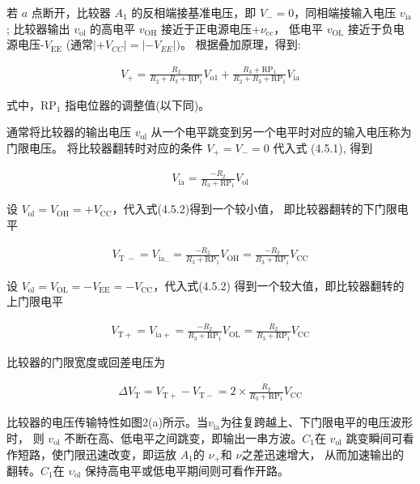\documentclass[a4paper,11pt,UTF8]{article}
\begin{document}
若 $a$ 点断开，比较器 $A_1$ 的反相端接基准电压，即 $V_-=0$，同相端接输入电压 $v_\mathrm{ia}$; 
比较器输出 $v_\mathrm{ol}$ 的高电平 $v_\mathrm{OH}$ 接近于正电源电压+$\nu_\mathrm{cc}$，
低电平 $v_\mathrm{OL}$ 接近于负电源电压-$V_\mathrm{EE}$ (通常$|+V_{CC}|=|-V_{EE}|)$。
根据叠加原理，得到:

\begin{align}
	V_{+}=\frac{R_{2}}{R_{2}+R_{3}+\mathrm{RP}_{1}}V_{\mathrm{o1}}+
    \frac{R_{3}+\mathrm{RP}_{1}}{R_{2}+R_{3}+\mathrm{RP}_{1}}V_{\mathrm{ia}}
\end{align}

式中，RP$_1$ 指电位器的调整值(以下同)。

通常将比较器的输出电压 $v_\mathrm{ol}$ 从一个电平跳变到另一个电平时对应的输入电压称为门限电压。
将比较器翻转时对应的条件 $V_+=V_-=0$ 代入式 (4.5.1), 得到

\begin{align}
	V_{\mathrm{ia}}=\frac{-R_{2}}{R_{3}+\mathrm{RP}_{1}}V_{\mathrm{ol}}
\end{align}

设 $V_{\mathrm{ol}}=V_{\mathrm{OH}}=+V_{\mathrm{CC}}$，代入式(4.5.2)得到一个较小值，
即比较器翻转的下门限电平

\begin{align}
	V_{\mathrm{T~-}}=V_{\mathrm{ia}_{-}}=\frac{-R_{2}}{R_{3}+
    \mathrm{RP}_{1}}V_{\mathrm{OH}}=\frac{-R_{2}}{R_{3}+
    \mathrm{RP}_{1}}V_{\mathrm{CC}}
\end{align}

设 $V_{\mathrm{ol}}=V_{\mathrm{OL}}=-V_{\mathrm{EE}}=-V_{\mathrm{CC}}$，代入式(4.5.2)
得到一个较大值，即比较器翻转的上门限电平

\begin{align}
	V_{\mathrm{T}+}=V_{\mathrm{ia}+}=\frac{-R_{2}}{R_{3}+
    \mathrm{RP}_{1}}V_{\mathrm{OL}}=\frac{R_{2}}{R_{3}+
    \mathrm{RP}_{1}}V_{\mathrm{CC}}
\end{align}

比较器的门限宽度或回差电压为

\begin{align}
	\Delta V_{\mathrm{T}}=V_{\mathrm{T+}}-V_{\mathrm{T-}}=
    2\times\frac{R_{2}}{R_{3}+\mathrm{RP}_{1}}V_{\mathrm{CC}}
\end{align}

比较器的电压传输特性如图2(a)所示。当$v_\mathrm{ia}$为往复跨越上、下门限电平的电压波形时，
则 $v_\mathrm{ol}$ 不断在高、低电平之间跳变，即输出一串方波。$C_1$在 $v_\mathrm{ol}$ 
跳变瞬间可看作短路，使门限迅速改变，即运放 $A_1$的 $\nu_+$和 $\nu$之差迅速增大，
从而加速输出的翻转。$C_1$在 $\upsilon_\mathrm{ol}$ 保持高电平或低电平期间则可看作开路。
\end{document}
